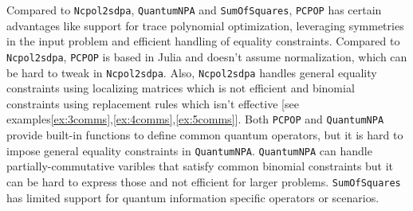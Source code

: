 Compared to \texttt{Ncpol2sdpa}, \texttt{QuantumNPA} and \texttt{SumOfSquares}, \texttt{PCPOP} has certain advantages like support for trace polynomial optimization, leveraging symmetries in the input problem and efficient handling of equality constraints. Compared to \texttt{Ncpol2sdpa}, \texttt{PCPOP} is based in Julia and doesn't assume normalization, which can be hard to tweak in \texttt{Ncpol2sdpa}. Also, \texttt{Ncpol2sdpa} handles general equality constraints using localizing matrices which is not efficient and binomial constraints using replacement rules which isn't effective [see examples\ref{ex:3comms},\ref{ex:4comms},\ref{ex:5comms}].  Both \texttt{PCPOP} and \texttt{QuantumNPA} provide built-in functions to define common quantum operators, but it is hard to impose general equality constraints in \texttt{QuantumNPA}. \texttt{QuantumNPA} can handle partially-commutative varibles that satisfy common binomial constraints but it can be hard to express those and not efficient for larger problems. \texttt{SumOfSquares} has limited support for quantum information specific operators or scenarios.
